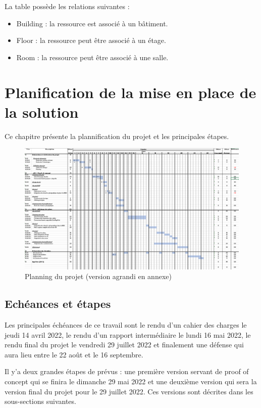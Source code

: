 \documentclass[
    iai, %
    il, %
]{heig-tb}
\begin{document}
La table possède les relations suivantes :
\begin{itemize}
    \item Building : la ressource est associé à un bâtiment.
    \item Floor : la ressource peut être associé à un étage.
    \item Room : la ressource peut être associé à une salle.
\end{itemize}

\section{Planification de la mise en place de la solution}
Ce chapitre présente la plannification du projet et les principales étapes.

\begin{figure}[H]
    \caption{Planning du projet (version agrandi en annexe)}
    \centering
    \includegraphics[scale=0.5]{planning.png}
\end{figure}

\subsection{Echéances et étapes}
Les principales échéances de ce travail sont le rendu d'un cahier des charges le jeudi 14 avril 2022,
le rendu d'un rapport intermédiaire le lundi 16 mai 2022,
le rendu final du projet le vendredi 29 juillet 2022 et
finalement une défense qui aura lieu entre le 22 août et le 16 septembre.

Il y'a deux grandes étapes de prévus :
une première version servant de proof of concept qui se finira le dimanche 29 mai 2022
et une deuxième version qui sera la version final du projet pour le 29 juillet 2022.
Ces versions sont décrites dans les sous-sections suivantes.
\end{document}
